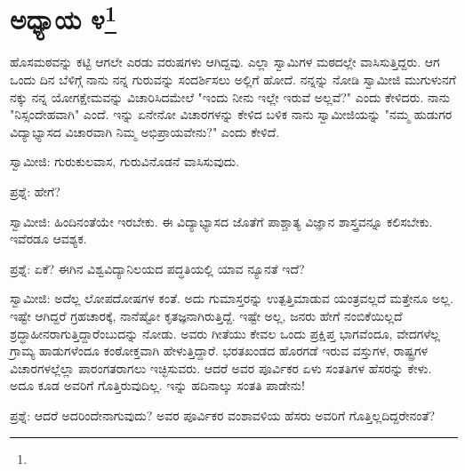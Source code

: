 \newpage

\chapter[ಅಧ್ಯಾಯ ೪]{ಅಧ್ಯಾಯ ೪\protect\footnote{}}

ಹೊಸಮಠವನ್ನು ಕಟ್ಟಿ ಆಗಲೇ ಎರಡು ವರುಷಗಳು ಆಗಿದ್ದವು. ಎಲ್ಲಾ ಸ್ವಾಮಿಗಳ ಮಠದಲ್ಲೇ ವಾಸಿಸುತ್ತಿದ್ದರು. ಆಗ ಒಂದು ದಿನ ಬೆಳಿಗ್ಗೆ ನಾನು ನನ್ನ ಗುರುವನ್ನು ಸಂದರ್ಶಿಸಲು ಅಲ್ಲಿಗೆ ಹೋದೆ. ನನ್ನನ್ನು ನೋಡಿ ಸ್ವಾಮೀಜಿ ಮುಗುಳುನಗೆ ನಕ್ಕು ನನ್ನ ಯೋಗಕ್ಷೇಮವನ್ನು ವಿಚಾರಿಸಿದಮೇಲೆ "ಇಂದು ನೀನು ಇಲ್ಲೇ ಇರುವೆ ಅಲ್ಲವೆ?" ಎಂದು ಕೇಳಿದರು. ನಾನು "ನಿಸ್ಸಂದೇಹವಾಗಿ" ಎಂದೆ. ಇನ್ನು ಏನೇನೋ ವಿಚಾರಗಳನ್ನು ಕೇಳಿದ ಬಳಿಕ ನಾನು ಸ್ವಾಮೀಜಿಯನ್ನು "ನಮ್ಮ ಹುಡುಗರ ವಿದ್ಯಾಭ್ಯಾಸದ ವಿಚಾರವಾಗಿ ನಿಮ್ಮ ಅಭಿಪ್ರಾಯವೇನು?" ಎಂದು ಕೇಳಿದೆ.

ಸ್ವಾಮೀಜಿ: ಗುರುಕುಲವಾಸ, ಗುರುವಿನೊಡನೆ ವಾಸಿಸುವುದು.

ಪ್ರಶ್ನೆ: ಹೇಗೆ?

ಸ್ವಾಮೀಜಿ: ಹಿಂದಿನಂತೆಯೇ ಇರಬೇಕು. ಈ ವಿದ್ಯಾಭ್ಯಾಸದ ಜೊತೆಗೆ ಪಾಶ್ಚಾತ್ಯ ವಿಜ್ಞಾನ ಶಾಸ್ತ್ರವನ್ನೂ ಕಲಿಸಬೇಕು. ಇವೆರಡೂ ಆವಶ್ಯಕ.

ಪ್ರಶ್ನೆ: ಏಕೆ? ಈಗಿನ ವಿಶ್ವವಿದ್ಯಾನಿಲಯದ ಪದ್ಧತಿಯಲ್ಲಿ ಯಾವ ನ್ಯೂನತೆ ಇದೆ?

ಸ್ವಾಮೀಜಿ: ಅದೆಲ್ಲ ಲೋಪದೋಷಗಳ ಕಂತೆ. ಅದು ಗುಮಾಸ್ತರನ್ನು ಉತ್ಪತ್ತಿಮಾಡುವ ಯಂತ್ರವಲ್ಲದೆ ಮತ್ತೇನೂ ಅಲ್ಲ. ಇಷ್ಟೇ ಆಗಿದ್ದರೆ ಗ್ರಹಚಾರಕ್ಕೆ, ನಾನೆಷ್ಟೋ ಕೃತಜ್ಞನಾಗಿರುತ್ತಿದ್ದೆ. ಇಷ್ಟೇ ಅಲ್ಲ, ಜನರು ಹೇಗೆ ನಂಬಿಕೆಯಿಲ್ಲದೆ ಶ್ರದ್ಧಾಹೀನರಾಗುತ್ತಿದ್ದಾರೆಂಬುದನ್ನು ನೋಡು. ಅವರು ಗೀತೆಯು ಕೇವಲ ಒಂದು ಪ್ರಕ್ಷಿಪ್ತ ಭಾಗವೆಂದೂ, ವೇದಗಳೆಲ್ಲ ಗ್ರಾಮ್ಯ ಹಾಡುಗಳೆಂದೂ ಕಂಠೋಕ್ತವಾಗಿ ಹೇಳುತ್ತಿದ್ದಾರೆ. ಭರತಖಂಡದ ಹೊರಗಡೆ ಇರುವ ವಸ್ತುಗಳ, ರಾಷ್ಟ್ರಗಳ ವಿಚಾರಗಳಲ್ಲೆಲ್ಲಾ ಪಾರಂಗತರಾಗಲು ಇಚ್ಛಿಸುವರು. ಆದರೆ ಅವರ ಪೂರ್ವಿಕರ ಏಳು ಸಂತತಿಗಳ ಹೆಸರನ್ನು ಕೇಳು. ಅದೂ ಕೂಡ ಅವರಿಗೆ ಗೊತ್ತಿರುವುದಿಲ್ಲ. ಇನ್ನು ಹದಿನಾಲ್ಕು ಸಂತತಿ ಪಾಡೇನು!

ಪ್ರಶ್ನೆ: ಆದರೆ ಅದರಿಂದೇನಾಗುವುದು? ಅವರ ಪೂರ್ವಿಕರ ವಂಶಾವಳಿಯ ಹೆಸರು ಅವರಿಗೆ ಗೊತ್ತಿಲ್ಲದಿದ್ದರೇನಂತೆ?

